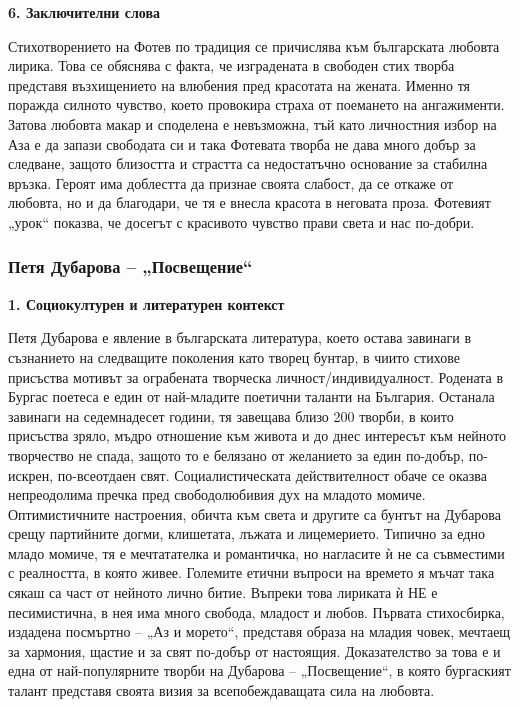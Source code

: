 \documentclass[12pt,a4paper]{article}
\begin{document}
\vspace{0.1cm}
 
\noindent 
\textbf{6. Заключителни слова}
\vspace{0.1cm}
 
\indent Стихотворението на Фотев по традиция се причислява към българската любовта лирика. Това се обяснява с факта, че изградената в свободен стих творба представя възхищението на влюбения пред красотата на жената. Именно тя поражда силното чувство, което провокира страха от поемането на ангажименти. Затова любовта макар и споделена е невъзможна, тъй като личностния избор на Аза е да запази свободата си и така Фотевата творба не дава много добър за следване, защото близостта и страстта са недостатъчно основание за стабилна връзка. Героят има доблестта да признае своята слабост, да се откаже от любовта, но и да благодари, че тя е внесла красота в неговата проза. Фотевият „урок“ показва, че досегът с красивото чувство прави света и нас по-добри.
\newpage

\subsubsection{\colorbox{green!40}{Петя Дубарова – „Посвещение“}}

\textbf{1. Социокултурен и литературен контекст}
\vspace{0.1cm}
 
\indent Петя Дубарова е явление в българската литература, което остава завинаги в съзнанието на следващите поколения като творец бунтар, в чиито стихове присъства мотивът за ограбената творческа личност/индивидуалност. Родената в Бургас поетеса е един от най-младите поетични таланти на България. Останала завинаги на седемнадесет години, тя завещава близо 200 творби, в които присъства зряло, мъдро отношение към живота и до днес интересът към нейното творчество не спада, защото то е белязано от желанието за един по-добър, по-искрен, по-всеотдаен свят. Социалистическата действителност обаче се оказва непреодолима пречка пред свободолюбивия дух на младото момиче. Оптимистичните настроения, обичта към света и другите са бунтът на Дубарова срещу партийните догми, клишетата, лъжата и лицемерието. Типично за едно младо момиче, тя е мечтатателка и романтичка, но нагласите ѝ не са съвместими с реалността, в която живее. Големите етични въпроси на времето я мъчат така сякаш са част от нейното лично битие. Въпреки това лириката ѝ НЕ е песимистична, в нея има много свобода, младост и любов. Първата стихосбирка, издадена посмъртно – „Аз и морето“, представя образа на младия човек, мечтаещ за хармония, щастие и за свят по-добър от настоящия. Доказателство за това е и една от най-популярните творби на Дубарова – „Посвещение“, в която бургаският талант представя своята визия за всепобеждаващата сила на любовта.
\end{document}
